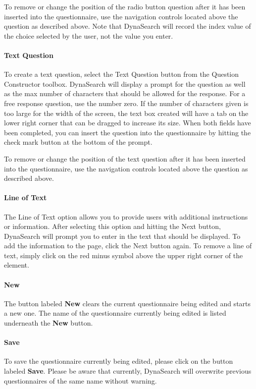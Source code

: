 \documentclass[article]{ij4uq}              %
\begin{document}
To remove or change the position of the radio button question after it has been inserted into the questionnaire, use the navigation controls located above the question as described above.  Note that DynaSearch will record the index value of the choice selected by the user, not the value you enter. 

\paragraph{Text Question}
To create a text question, select the Text Question button from the Question Constructor toolbox.  DynaSearch will display a prompt for the question as well as the max number of characters that should be allowed for the response.   For a free response question, use the number zero.  If the number of characters given is too large for the width of the screen, the text box created will have a tab on the lower right corner that can be dragged to increase its size.  When both fields have been completed, you can insert the question into the questionnaire by hitting the check mark button at the bottom of the prompt.

To remove or change the position of the text question after it has been inserted into the questionnaire, use the navigation controls located above the question as described above. 

\paragraph{Line of Text}
The Line of Text option allows you to provide users with additional instructions or information. After selecting this option and hitting the Next button, DynaSearch will prompt you to enter in the text that should be displayed. To add the information to the page, click the Next button again. To remove a line of text, simply click on the red minus symbol above the upper right corner of the element.

\paragraph{New}
The button labeled \textbf{New} clears the current questionnaire being edited and starts a new one.  The name of the questionnaire currently being edited is listed underneath the \textbf{New} button.

\paragraph{Save}
To save the questionnaire currently being edited, please click on the button labeled \textbf{Save}.  Please be aware that currently, DynaSearch will overwrite previous questionnaires of the same name without warning.
\end{document}
